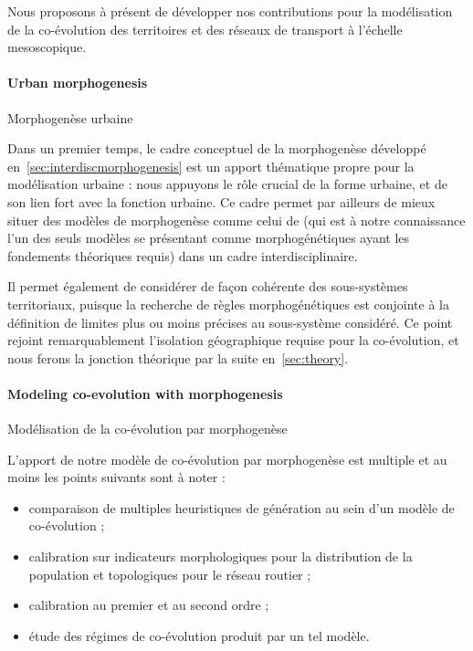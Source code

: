 Nous proposons à présent de développer nos contributions pour la modélisation de la co-évolution des territoires et des réseaux de transport à l'échelle mesoscopique. 

\paragraph{Urban morphogenesis}{Morphogenèse urbaine}


Dans un premier temps, le cadre conceptuel de la morphogenèse développé en~\ref{sec:interdiscmorphogenesis} est un apport thématique propre pour la modélisation urbaine : nous appuyons le rôle crucial de la forme urbaine, et de son lien fort avec la fonction urbaine. Ce cadre permet par ailleurs de mieux situer des modèles de morphogenèse comme celui de \cite{bonin2014modelisation} (qui est à notre connaissance l'un des seuls modèles se présentant comme morphogénétiques ayant les fondements théoriques requis) dans un cadre interdisciplinaire.

Il permet également de considérer de façon cohérente des sous-systèmes territoriaux, puisque la recherche de règles morphogénétiques est conjointe à la définition de limites plus ou moins précises au sous-système considéré. Ce point rejoint remarquablement l'isolation géographique requise pour la co-évolution, et nous ferons la jonction théorique par la suite en~\ref{sec:theory}.


\paragraph{Modeling co-evolution with morphogenesis}{Modélisation de la co-évolution par morphogenèse}


L'apport de notre modèle de co-évolution par morphogenèse est multiple et au moins les points suivants sont à noter :
\begin{itemize}
	\item comparaison de multiples heuristiques de génération au sein d'un modèle de co-évolution ;
	\item calibration sur indicateurs morphologiques pour la distribution de la population et topologiques pour le réseau routier ;
	\item calibration au premier et au second ordre ;
	\item étude des régimes de co-évolution produit par un tel modèle.
\end{itemize}

